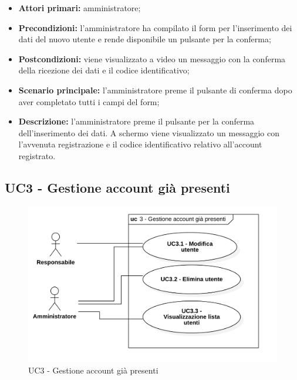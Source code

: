 \begin{itemize}
	\item 	\textbf{Attori primari:} amministratore;
	\item 	\textbf{Precondizioni:} l'amministratore ha compilato il form per l'inserimento dei dati del nuovo utente e rende disponibile un pulsante per la conferma;
	\item 	\textbf{Postcondizioni:} viene visualizzato a video un messaggio con la conferma della ricezione dei dati e il codice identificativo;
	\item 	\textbf{Scenario principale:} l'amministratore preme il pulsante di conferma dopo aver completato tutti i campi del form;
	\item 	\textbf{Descrizione:} l'amministratore preme il pulsante per la conferma dell'inserimento dei dati. A schermo viene visualizzato un messaggio con l'avvenuta registrazione e il codice identificativo relativo all'account registrato.

\end{itemize}

\subsection{UC3 - Gestione account già presenti}
\begin{figure}[H]
	\centering
	\includegraphics[scale=0.62]{res/images/uc3.png}
	\caption{UC3 - Gestione account già presenti}
\end{figure}

